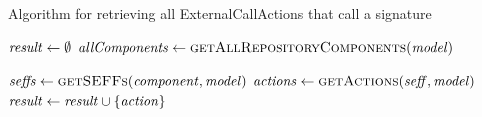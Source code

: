 \begin{algorithm}
    \caption{Algorithm for retrieving all ExternalCallActions that call a signature}
    \label{alg:impactanalysis:interface:externalcallaction}
    \begin{algorithmic}[1]
            \algindentskip
            \State $\mathit{result} \gets \emptyset$
            \State $\mathit{allComponents} \gets \textsc{getAllRepositoryComponents}(\mathit{model})$
            \algblockskip

              \label{alg:impactanalysis:interface:externalcallaction:4}
                \State $\mathit{seffs} \gets \textsc{getSEFFs}(\mathit{component}, \mathit{model})$
                    \State $\mathit{actions} \gets \textsc{getActions}(\mathit{seff}, \mathit{model})$
                     
                             \label{alg:impactanalysis:interface:externalcallaction:10}
                                \State $\mathit{result} \gets \mathit{result} \cup \{ \mathit{action} \}$
                            \EndIf
                        \EndIf
                    \EndFor
                \EndFor
            \EndFor
            \algblockskip

            \State {}
            \algindentskip
        \EndProcedure   
    \end{algorithmic}
\end{algorithm}

